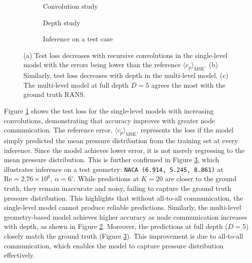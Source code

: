 \documentclass{marine_2025_paper_template}
\begin{document}
\begin{figure}[t]
    \centering
    \begin{subfigure}{0.25\textwidth}
        \centering
        \vspace{1cm}
        \raisebox{0cm}{}
        \caption{Convolution study}
        \label{fig:bgnn_test_loss}
    \end{subfigure}
    \hfill
    \begin{subfigure}{0.25\textwidth}
        \centering
        \vspace{1cm}
        \raisebox{0cm}{}
        \caption{Depth study}
        \label{fig:bgun_test_loss}
    \end{subfigure}\hfill
    \begin{subfigure}{0.38\textwidth}
        \centering
        \vspace{1cm}
        
        \caption{Inference on a test case}
        \label{fig:compare_bgnn_bgun_cp}
    \end{subfigure}
    \vspace{-0.2cm}
    \caption{(a) Test loss decreases with recursive convolutions in the single-level model with the errors being lower than the reference $\langle c_p \rangle_{\text{MSE}}$. (b) Similarly, test loss decreases with depth in the multi-level model. (c) The multi-level model at full depth $D=5$ agrees the most with the ground truth RANS.}
    \label{fig:conv_depth_study}
\end{figure}

Figure \ref{fig:bgnn_test_loss} shows the test loss for the single-level models with increasing convolutions, demonstrating that accuracy improves with greater node communication. The reference error, $\langle c_p \rangle_{\text{MSE}}$, represents the loss if the model simply predicted the mean pressure distribution from the training set at every inference. Since the model achieves lower error, it is not merely regressing to the mean pressure distribution. This is further confirmed in Figure \ref{fig:compare_bgnn_bgun_cp}, which illustrates inference on a test geometry: \texttt{NACA (6.914, 5.245, 8.861)} at $\mathrm{Re}=2.76 \times 10^6$, $\alpha=6 ^{\circ}$. While predictions at $K=20$ are closer to the ground truth, they remain inaccurate and noisy, failing to capture the ground truth pressure distribution. This highlights that without all-to-all communication, the single-level model cannot produce reliable predictions. Similarly, the multi-level geometry-based model achieves higher accuracy as node communication increases with depth, as shown in Figure \ref{fig:bgun_test_loss}. Moreover, the predictions at full depth ($D=5$) closely match the ground truth (Figure \ref{fig:compare_bgnn_bgun_cp}). This improvement is due to all-to-all communication, which enables the model to capture pressure distribution effectively.
\end{document}
